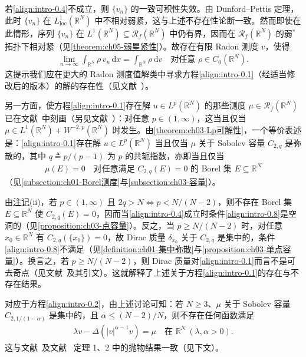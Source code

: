 \documentclass[../main.tex]{subfiles}
\begin{document}
若\eqref{align:intro-0.4}不成立，则 $\{v_n\}$ 的一致可积性失效。由 Dunford--Pettis 定理，此时 $\{v_n\}$ 在 $L^1_{\mathrm{loc}}(\mathbb{R}^N)$ 中不相对弱紧，这与上述不存在性论断一致。然而即使在此情形，序列 $\{v_n\}$ 在 $L^1(\mathbb{R}^N)\subseteq\mathscr{R}_f(\mathbb{R}^N)$ 中仍有界，因而在 $\mathscr{R}_f(\mathbb{R}^N)$ 的弱$^*$拓扑下相对紧（见\cref{theorem:ch05-弱星紧性}）。故存在有限 Radon 测度 $v$，使得
\begin{align*}
\lim_{n\to\infty}\int_{\mathbb{R}^N}\rho\,v_n\,\mathrm{d}x
= \int_{\mathbb{R}^N}\rho\,\mathrm{d}v
\quad \text{对任意 }\rho\in C_0(\mathbb{R}^N).
\end{align*}
这提示我们应在更大的 Radon 测度值解类中寻求方程\eqref{align:intro-0.1}（经适当修改后的版本）的解的存在性（见文献~\cite{ref97}）。

另一方面，使方程\eqref{align:intro-0.1}存在解 $u\in L^p(\mathbb{R}^N)$ 的那些测度 $\mu\in\mathscr{R}_f(\mathbb{R}^N)$ 已在文献~\cite{ref10}中刻画（另见文献~\cite{ref52}）：对任意 $p\in(1,\infty)$，这当且仅当 $\mu\in L^1(\mathbb{R}^N)+W^{-2,p}(\mathbb{R}^N)$ 时发生。由\cref{theorem:ch03-Lp可解性}，一个等价表述是：\eqref{align:intro-0.1}存在解 $u\in L^p(\mathbb{R}^N)$ 当且仅当 $\mu$ 关于 Sobolev 容量 $C_{2,q}$ 是弥散的，其中 $q\triangleq p/(p-1)$ 为 $p$ 的共轭指数，亦即当且仅当
\begin{align}
\mu(E)=0 \quad \text{对任意满足 } C_{2,q}(E)=0 \text{ 的 Borel 集 }E\subseteq\mathbb{R}^N \label{align:intro-0.8}
\end{align}
（见\cref{subsection:ch01-Borel测度}与\cref{subsection:ch03-容量}）。

由\hyperref[remark:ch03-无零容量集]{注记}(ii)，若 $p\in(1,\infty)$ 且 $2q>N\Leftrightarrow p<N/(N-2)$，则不存在 Borel 集 $E\subseteq\mathbb{R}^N$ 使 $C_{2,q}(E)=0$，因而当\eqref{align:intro-0.4}成立时条件\eqref{align:intro-0.8}是空洞的（见\cref{proposition:ch03-点容量}）。反之，当 $p\geqslant N/(N-2)$ 时，对任意 $x_0\in\mathbb{R}^N$ 有 $C_{2,q}(\{x_0\})=0$，故 Dirac 质量 $\delta_{x_0}$ 关于 $C_{2,q}$ 是集中的，条件\eqref{align:intro-0.8}不满足（见\cref{definition:ch01-集中弥散}与\cref{proposition:ch03-单点容量}）。换言之，若 $p\geqslant N/(N-2)$，则 Dirac 质量对\eqref{align:intro-0.1}而言不是可去奇点（见文献~\cite{ref105}及其引文）。这就解释了上述关于方程\eqref{align:intro-0.1}的存在与不存在结果。

\begin{remark}\label{remark:intro-0.1.1}
对应于方程\eqref{align:intro-0.2}，由上述讨论可知：若 $N\geqslant 3$、$\mu$ 关于 Sobolev 容量 $C_{2,1/(1-\alpha)}$ 是集中的，且 $\alpha\leqslant (N-2)/N$，则不存在任何函数满足
\begin{align*}
\lambda v - \Delta(|v|^{\alpha-1}v) = \mu \quad \text{在 }\mathbb{R}^N\ (\lambda,\alpha>0).
\end{align*}
这与文献~\cite{ref26}及文献~\cite{ref80} 定理 1、2 中的抛物结果一致（见下文）。
\end{remark}
\end{document}
